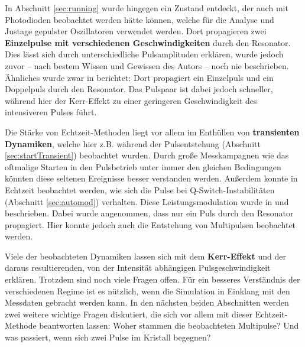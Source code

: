 \documentclass[bachelor,       %
               twoside,        %
               BCOR10mm,       %
               liststotoc,nomtotoc,bibtotoc, %
               english,ngerman, %
               final,          %
               ]{GAUBM}
\begin{document}
In Abschnitt \ref{sec:running} wurde hingegen ein Zustand entdeckt, der auch mit Photodioden beobachtet werden hätte können, welche für die Analyse und Justage gepulster Oszillatoren verwendet werden.
Dort propagieren zwei \textbf{Einzelpulse mit verschiedenen Geschwindigkeiten} durch den Resonator.
Dies lässt sich durch unterschiedliche Pulsamplituden erklären, wurde jedoch zuvor -- nach bestem Wissen und Gewissen des Autors -- noch nie beschrieben.
Ähnliches wurde zwar in \cite{grelu_group_2004} berichtet:
Dort propagiert ein Einzelpuls und ein Doppelpuls durch den Resonator.
Das Pulspaar ist dabei jedoch schneller, während hier der Kerr-Effekt zu einer geringeren Geschwindigkeit des intensiveren Pulses führt.

Die Stärke von Echtzeit-Methoden liegt vor allem im Enthüllen von \textbf{transienten Dynamiken}, welche hier z.B. während der Pulsentstehung (Abschnitt \ref{sec:startTransient}) beobachtet wurden.
Durch große Messkampagnen wie das oftmalige Starten in den Pulsbetrieb unter immer den gleichen Bedingungen könnten diese seltenen Ereignisse besser verstanden werden.
Außerdem konnte in Echtzeit beobachtet werden, wie sich die Pulse bei Q-Switch-Instabilitäten (Abschnitt \ref{sec:automod}) verhalten. 
Diese Leistungsmodulation wurde in \cite{xing_self-q_1995} und \cite{jasapara_automodulations_2000} beschrieben.
Dabei wurde angenommen, dass nur ein Puls durch den Resonator propagiert.
Hier konnte jedoch auch die Entstehung von Multipulsen beobachtet werden.

Viele der beobachteten Dynamiken lassen sich mit dem \textbf{Kerr-Effekt} und der daraus resultierenden, von der Intensität abhängigen Pulsgeschwindigkeit erklären.
Trotzdem sind noch viele Fragen offen.
Für ein besseres Verständnis der verschiedenen Regime ist es nützlich, wenn die Simulation in Einklang mit den Messdaten gebracht werden kann.
In den nächsten beiden Abschnitten werden zwei weitere wichtige Fragen diskutiert, die sich vor allem mit dieser Echtzeit-Methode beantworten lassen:
Woher stammen die beobachteten Multipulse? Und was passiert, wenn sich zwei Pulse im Kristall begegnen?
\end{document}

